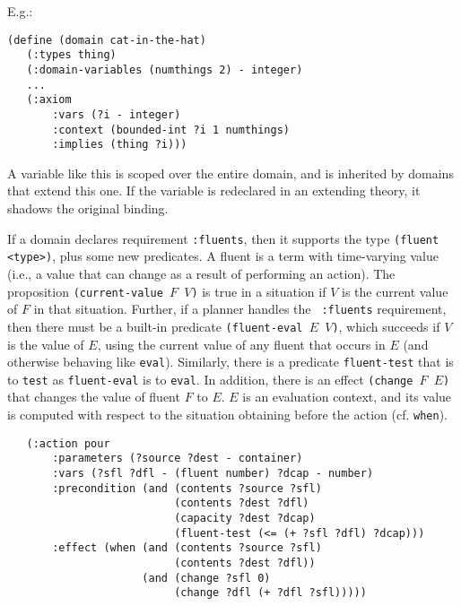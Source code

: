 E.g.:
\begin{verbatim}
(define (domain cat-in-the-hat) 
   (:types thing)
   (:domain-variables (numthings 2) - integer)
   ...
   (:axiom 
       :vars (?i - integer)
       :context (bounded-int ?i 1 numthings)
       :implies (thing ?i)))
\end{verbatim}

A variable like this is scoped over the entire domain, and is
inherited by domains that extend this one.  If the variable is
redeclared in an extending theory, it shadows the original binding.

If a domain declares requirement {\tt :fluents}, then it supports the
type {\tt (fluent <type>)}, plus some new predicates.  A fluent is a
term with time-varying value (i.e., a value that can change as a
result of performing an action).  The proposition {\tt (current-value
$F$ $V$)} is true in a situation if $V$ is the current value of $F$ in
that situation.
Further, if a planner handles  the {\tt
:fluents} requirement, then there must be a built-in predicate
{\tt (fluent-eval $E$ $V$)}, which succeeds if $V$ is the 
value of $E$, using the current value of any fluent that occurs in $E$ 
(and otherwise behaving like {\tt eval}).  Similarly, there is a predicate
{\tt fluent-test} that is to {\tt test} as {\tt fluent-eval} is to {\tt eval}.
In addition, there is an effect 
{\tt (change $F$ $E$)} that changes the value of fluent $F$ to $E$.  $E$ is
an evaluation context, and its value is computed with respect to the situation 
obtaining before the action (cf. {\tt when}).

\begin{verbatim}
   (:action pour
       :parameters (?source ?dest - container)
       :vars (?sfl ?dfl - (fluent number) ?dcap - number)
       :precondition (and (contents ?source ?sfl)
                          (contents ?dest ?dfl)
                          (capacity ?dest ?dcap)
                          (fluent-test (<= (+ ?sfl ?dfl) ?dcap)))
       :effect (when (and (contents ?source ?sfl)
                          (contents ?dest ?dfl))
                     (and (change ?sfl 0)
                          (change ?dfl (+ ?dfl ?sfl)))))
\end{verbatim}


